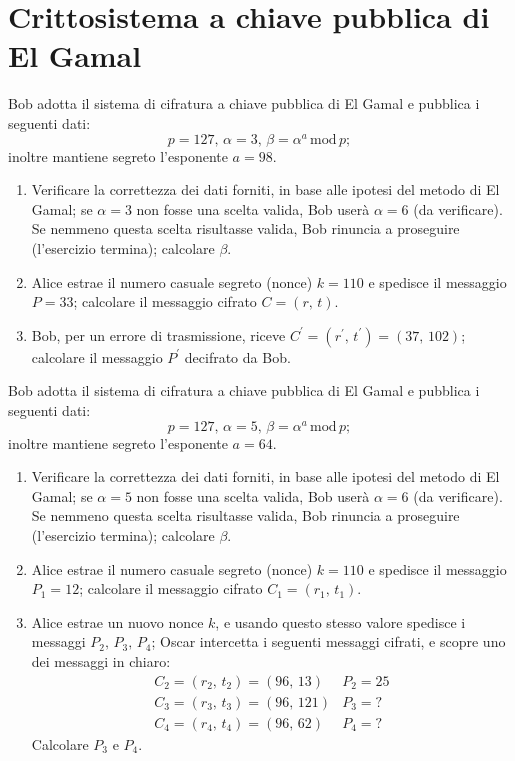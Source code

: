     \bigskip
    \section{Crittosistema a chiave pubblica di El Gamal}
        Bob adotta il sistema di cifratura a chiave pubblica di El Gamal e pubblica i seguenti dati: \[
            p=127,\, \alpha=3,\, \beta= \alpha^{a} \,\mathrm{mod}\, p
        ;\] inoltre mantiene segreto l'esponente $a=98$.
        \begin{enumerate}
            \item Verificare la correttezza dei dati forniti, in base alle ipotesi del metodo di 
                El Gamal; se $\alpha=3$ non fosse una scelta valida, Bob userà $\alpha=6$ (da verificare). 
                Se nemmeno questa scelta risultasse valida, Bob rinuncia a proseguire (l'esercizio 
                termina); calcolare $\beta$.
            \item Alice estrae il numero casuale segreto (nonce) $k=110$ e spedisce il messaggio $P=33$; 
                calcolare il messaggio cifrato $C=(r,\,t)$.
            \item Bob, per un errore di trasmissione, riceve $C^{\prime}=(r^{\prime},\,t^{\prime})=(37,\,102)$; 
                calcolare il messaggio $P^{\prime}$ decifrato da Bob.
        \end{enumerate}

        Bob adotta il sistema di cifratura a chiave pubblica di El Gamal e pubblica i seguenti dati: \[
            p=127,\, \alpha=5,\, \beta= \alpha^{a} \,\mathrm{mod}\, p
        ;\] inoltre mantiene segreto l'esponente $a=64$.
        \begin{enumerate}
            \item Verificare la correttezza dei dati forniti, in base alle ipotesi del metodo di 
                El Gamal; se $\alpha=5$ non fosse una scelta valida, Bob userà $\alpha=6$ (da verificare). 
                Se nemmeno questa scelta risultasse valida, Bob rinuncia a proseguire (l'esercizio 
                termina); calcolare $\beta$.
            \item Alice estrae il numero casuale segreto (nonce) $k=110$ e spedisce il messaggio $P_1=12$; 
                calcolare il messaggio cifrato $C_1=(r_1,\,t_1)$.
            \item Alice estrae un nuovo nonce $k$, e usando questo stesso valore spedisce i messaggi 
                $P_2,\,P_3,\,P_4$; Oscar intercetta i seguenti messaggi cifrati, e scopre uno dei messaggi 
                in chiaro: \[
                \begin{array}{ll}
                    C_2=(r_2,\,t_2)=(96,\,13) & P_2=25\\
                    C_3=(r_3,\,t_3)=(96,\,121) & P_3=?\\
                    C_4=(r_4,\,t_4)=(96,\,62) & P_4=?
                \end{array}
                \] Calcolare $P_3$ e $P_4$.
        \end{enumerate}

